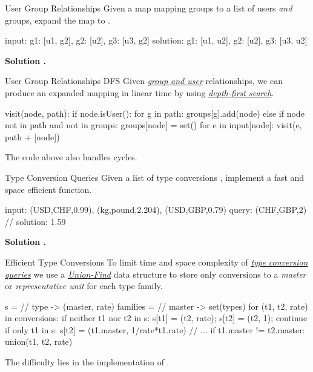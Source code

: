 \documentclass{cognito}
\begin{document}
\begin{note}{User Group Relationships}
	Given a map  mapping groups to a list
	of users \emph{and} groups, expand the map to .
	\begin{largecode}
 input: { g1: [u1, g2], g2: [u2], g3: [u3, g2] }
 solution: { g1: [u1, u2], g2: [u2], g3: [u3, u2] }
	\end{largecode}
	\bf Solution \hyperref[note:User Group Relationships DFS]{\solutionref}.
\end{note}

\begin{note}{User Group Relationships DFS}
	Given \hyperref[note:User Group Relationships]{\it group and user} relationships,
	we can produce an expanded  mapping in linear time by using \hyperref[note:Depth-First Search]{\it depth-first search}.
	\begin{largecode}
 visit(node, path):
 	if node.isUser():
		for g in path: groups[g].add(node)
	else if node not in path and not in groups:
		groups[node] = set()
		for e in input[node]: visit(e, path + [node]) 	
	\end{largecode}
	\vspace{-5pt}
	\begin{remark} The code above also handles cycles. \end{remark}
	\vspace{-5pt}
\end{note}

\begin{note}{Type Conversion Queries}
	Given a list of type conversions ,
	implement a fast and space efficient  function.
	\begin{largecode}
 input: (USD,CHF,0.99), (kg,pound,2.204), (USD,GBP,0.79)
 query: (CHF,GBP,2)  // solution: 1.59
	\end{largecode}
	\bf Solution \hyperref[note:Efficient Type Conversions]{\solutionref}.
\end{note}

\begin{note}{Efficient Type Conversions}
	To limit time and space complexity of \hyperref[note:Type Conversion Queries]{\it type conversion queries}
	we use a \hyperref[note:Disjoint-Set Data Structure]{\it Union-Find} data structure to store only conversions to a \emph{master} or \emph{representative unit}
	for each type family.
	\begin{largecode}
 s = { } 	    // type -> (master, rate)
 families = { } // master -> set(types)
 for (t1, t2, rate) in conversions:
 	if neither t1 nor t2 in s:
		s[t1] = (t2, rate); s[t2] = (t2, 1); continue
 	if only t1 in s: s[t2] = (t1.master, 1/rate*t1.rate)
	// ...
	if t1.master != t2.master: union(t1, t2, rate)
	\end{largecode}
	\vspace{-5pt}
	\begin{remark} The difficulty lies in the implementation of . \end{remark}
	\vspace{-5pt}
\end{note}
\end{document}
